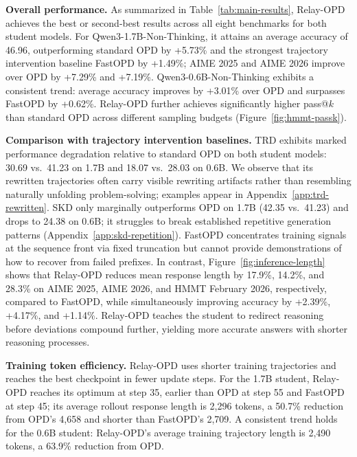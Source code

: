 \documentclass{article} %
\begin{document}
\textbf{Overall performance.} As summarized in Table~\ref{tab:main-results}, Relay-OPD achieves the best or second-best results across all eight benchmarks for both student models. For Qwen3-1.7B-Non-Thinking, it attains an average accuracy of 46.96, outperforming standard OPD by +5.73\% and the strongest trajectory intervention baseline FastOPD by +1.49\%; AIME 2025 and AIME 2026 improve over OPD by +7.29\% and +7.19\%. Qwen3-0.6B-Non-Thinking exhibits a consistent trend: average accuracy improves by +3.01\% over OPD and surpasses FastOPD by +0.62\%. Relay-OPD further achieves significantly higher pass@$k$ than standard OPD across different sampling budgets (Figure~\ref{fig:hmmt-passk}).\par

\textbf{Comparison with trajectory intervention baselines.} TRD exhibits marked performance degradation relative to standard OPD on both student models: 30.69 vs.\ 41.23 on 1.7B and 18.07 vs.\ 28.03 on 0.6B. We observe that its rewritten trajectories often carry visible rewriting artifacts rather than resembling naturally unfolding problem-solving; examples appear in Appendix~\ref{app:trd-rewritten}. SKD only marginally outperforms OPD on 1.7B (42.35 vs.\ 41.23) and drops to 24.38 on 0.6B; it struggles to break established repetitive generation patterns (Appendix~\ref{app:skd-repetition}). FastOPD concentrates training signals at the sequence front via fixed truncation but cannot provide demonstrations of how to recover from failed prefixes. In contrast, Figure~\ref{fig:inference-length} shows that Relay-OPD reduces mean response length by 17.9\%, 14.2\%, and 28.3\% on AIME 2025, AIME 2026, and HMMT February 2026, respectively, compared to FastOPD, while simultaneously improving accuracy by +2.39\%, +4.17\%, and +1.14\%. Relay-OPD teaches the student to redirect reasoning before deviations compound further, yielding more accurate answers with shorter reasoning processes.\par

\textbf{Training token efficiency.} Relay-OPD uses shorter training trajectories and reaches the best checkpoint in fewer update steps. For the 1.7B student, Relay-OPD reaches its optimum at step 35, earlier than OPD at step 55 and FastOPD at step 45; its average rollout response length is 2,296 tokens, a 50.7\% reduction from OPD's 4,658 and shorter than FastOPD's 2,709. A consistent trend holds for the 0.6B student: Relay-OPD's average training trajectory length is 2,490 tokens, a 63.9\% reduction from OPD.\par
\end{document}
